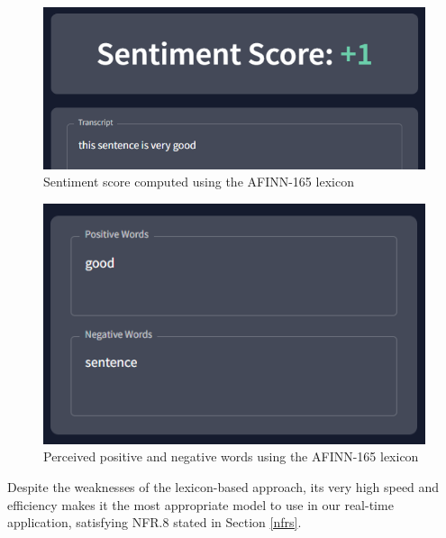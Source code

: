 \documentclass[12pt, a4paper]{article}
\newcommand{\np}
    {
    \vskip 0.4cm
    }
\begin{document}
\np
\begin{figure}[H]
    \centering
    \includegraphics[scale=0.70]{images/sa1.png}
    \caption{Sentiment score computed using the AFINN-165 lexicon}
    \label{fig:sa1}
\end{figure}

\begin{figure}[H]
    \centering
    \includegraphics[scale=0.84]{images/sa2.png}
    \caption{Perceived positive and negative words using the AFINN-165 lexicon}
    \label{fig:sa2}
\end{figure}

Despite the weaknesses of the lexicon-based approach, its very high speed and efficiency makes it the most appropriate model to use in our real-time application, satisfying NFR.8 stated in Section \ref{nfrs}.


\end{document}
